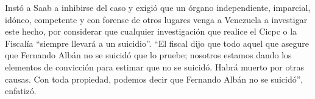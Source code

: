 \documentclass{article}%
\begin{document}
\newline%
%
Instó a Saab a inhibirse del caso y exigió que un órgano independiente, imparcial, idóneo, competente y con forense de otros lugares venga a Venezuela a investigar este hecho, por considerar que cualquier investigación que realice el Cicpc o la Fiscalía “siempre llevará a un suicidio”.%
\newline%
%
“El fiscal dijo que todo aquel que asegure que Fernando Albán no se suicidó que lo pruebe; nosotros estamos dando los elementos de convicción para estimar que no se suicidó. Habrá muerto por otras causas. Con toda propiedad, podemos decir que Fernando Albán no se suicidó”, enfatizó.%
\newline%
%
\end{document}

